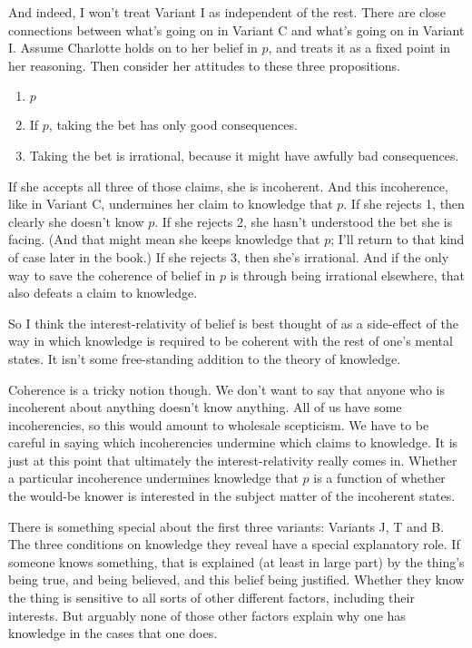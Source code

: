 \documentclass[11pt,]{book}
\providecommand{\tightlist}{%
  \setlength{\itemsep}{0pt}\setlength{\parskip}{0pt}}
\begin{document}
And indeed, I won't treat Variant I as independent of the rest. There are close connections between what's going on in Variant C and what's going on in Variant I. Assume Charlotte holds on to her belief in \(p\), and treats it as a fixed point in her reasoning. Then consider her attitudes to these three propositions.

\begin{enumerate}
\def\labelenumi{\arabic{enumi}.}
\tightlist
\item
  \(p\)
\item
  If \(p\), taking the bet has only good consequences.
\item
  Taking the bet is irrational, because it might have awfully bad consequences.
\end{enumerate}

If she accepts all three of those claims, she is incoherent. And this incoherence, like in Variant C, undermines her claim to knowledge that \(p\). If she rejects 1, then clearly she doesn't know \(p\). If she rejects 2, she hasn't understood the bet she is facing. (And that might mean she keeps knowledge that \(p\); I'll return to that kind of case later in the book.) If she rejects 3, then she's irrational. And if the only way to save the coherence of belief in \(p\) is through being irrational elsewhere, that also defeats a claim to knowledge.

So I think the interest-relativity of belief is best thought of as a side-effect of the way in which knowledge is required to be coherent with the rest of one's mental states. It isn't some free-standing addition to the theory of knowledge.

Coherence is a tricky notion though. We don't want to say that anyone who is incoherent about anything doesn't know anything. All of us have some incoherencies, so this would amount to wholesale scepticism. We have to be careful in saying which incoherencies undermine which claims to knowledge. It is just at this point that ultimately the interest-relativity really comes in. Whether a particular incoherence undermines knowledge that \(p\) is a function of whether the would-be knower is interested in the subject matter of the incoherent states.

There is something special about the first three variants: Variants J, T and B. The three conditions on knowledge they reveal have a special explanatory role. If someone knows something, that is explained (at least in large part) by the thing's being true, and being believed, and this belief being justified. Whether they know the thing is sensitive to all sorts of other different factors, including their interests. But arguably none of those other factors explain why one has knowledge in the cases that one does.
\end{document}
